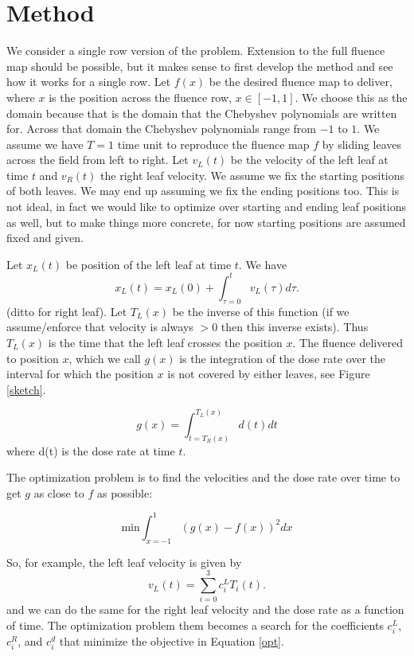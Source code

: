 \section{Method}


We consider a single row version of the problem. Extension to the full fluence map should be possible, but it makes sense
to first develop the method and see how it works for a single row. Let $f(x)$ be the desired fluence map to deliver, where
$x$ is the position across the fluence row, $x \in [-1,1]$. We choose this as the domain because that is the
domain that the Chebyshev polynomials are written for. Across that domain the Chebyshev polynomials range from $-1$ to $1$.
We assume we have $T=1$ time unit to reproduce the fluence map $f$ by sliding leaves across the field from left to right.
Let $v_L(t)$ be the velocity of the left leaf at time $t$ and $v_R(t)$ the right leaf velocity. We assume we fix the starting positions
of both leaves. We may end up assuming we fix the ending positions too. This is not ideal, in fact we would like to optimize over
starting and ending leaf positions as well, but to make things more concrete, for now starting positions are assumed fixed and given.

Let $x_L(t)$ be position of the left leaf at time $t$. We have
\begin{equation}
  x_L(t) = x_L(0) + \int_{\tau=0}^t v_L(\tau) d\tau.
\end{equation}
\noindent (ditto for right leaf). Let $T_L(x)$ be the inverse of this function
(if we assume/enforce that velocity is always $>0$ then this inverse exists). Thus
$T_L(x)$ is the time that the left leaf crosses the position $x$. The fluence delivered to position
$x$, which we call $g(x)$ is the integration of the dose rate over the interval for which the position $x$ is not covered by either leaves, see Figure \ref{sketch}.

\begin{equation}
  g(x) = \int_{t = T_R(x)}^{T_L(x)} d(t) dt
\end{equation}
\noindent where d(t) is the dose rate at time $t$.

The optimization problem is to find the velocities and the dose rate over time to get $g$ as close to $f$ as possible:

\begin{equation}
\mathrm{min} \int_{x=-1}^1 \left ( g(x) - f(x) \right )^2 dx
\label{opt}
\end{equation}


So, for example, the left leaf velocity is given by
$$
v_L(t) = \sum_{i=0}^3 c^L_i T_i(t).
$$
\noindent and we can do the same for the right leaf velocity and the dose rate as a function of time.
The optimization problem them becomes a search for the coefficients $c^L_i$, $c^R_i$, and $c^d_i$ that minimize the objective in Equation \ref{opt}.
